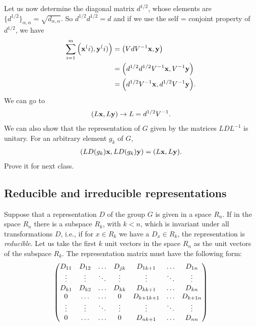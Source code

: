 Let us now determine the diagonal matrix $d^{1/2}$, whose  elements are
$\{d^{1/2}\}_{\alpha,\alpha}=\sqrt{d_{\alpha,\alpha}}$.
So $d^{1/2}d^{1/2}=d$ and if we use the self = conjoint property of $d^{1/2}$, we
have
\begin{align}
    \sum_{i=1}^m\qty(\vb{x}^(i),\vb{y}^(i))&=\qty(VdV^{-1}\vb{x},\vb{y})\\
                                           &=\qty(d^{1/2}d^{1/2}V^{-1}\vb{x},V^{-1}\vb{y})\\
                                           &=\qty(d^{1/2}V^{-1}\vb{x},d^{1/2}V^{-1}\vb{y}).
\end{align}
We can go to
\begin{align}
    \qty(L\vb{x},L\vb{y})\rightarrow L=d^{1/2}V^{-1}.
\end{align}
We can also show that the representation of $G$ given by the matrices $LDL^{-1}$
is unitary. For an arbitrary element $g_k$ of $G$,
\begin{align}
    \qty(LD(g_k)\vb{x},LD(g_k)\vb{y})=\qty(L\vb{x},L\vb{y}).
\end{align}
Prove it for next class.


\subsection{Reducible and irreducible representations} %
\label{sub:Reducible and irreducible representations}

Suppose that a representation $D$ of the group $G$ is given in a space $R_n$. If
in the space $R_n$ there is a subspace $R_k$, with $k<n$, which is invariant
under all transformations $D$, i.e., if for $x\in R_k$ we have a $D_x\in R_k$,
the representation is \emph{reducible}. Let us take the first $k$ unit vectors
in the space $R_n$ as the unit vectors of the subspace $R_k$. The representation
matrix must have the following form:
\begin{align}
    \mqty(D_{11} & D_{12} & \dots & D_{jk} & D_{1 k+1} & \dots & D_{1n}\\
    \vdots & \vdots & \ddots & \vdots & \vdots & \ddots & \vdots \\
    D_{k1} & D_{k2} & \dots & D_{kk} & D_{kk+1} & \dots & D_{kn}\\
    0 & \dots & \dots & 0 & D_{k+1 k+1} & \dots & D_{k+1n}\\
    \vdots & \vdots & \ddots & \vdots & \vdots & \ddots & \vdots\\
    0 & \dots & \dots & 0 & D_{nk+1} & \dots &D_{nn}
    )
\end{align}

